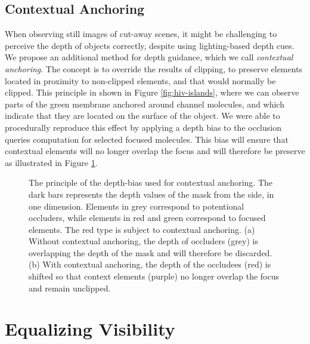 \subsection{Contextual Anchoring}
\label{ssec:anchoring}

When observing still images of cut-away scenes, it might be challenging to perceive the depth of objects correctly, despite using lighting-based depth cues.
We propose an additional method for depth guidance, which we call \emph{contextual anchoring}.
The concept is to override the results of clipping, to preserve elements located in proximity to non-clipped elements, and that would normally be clipped.
This principle in shown in Figure \ref{fig:hiv-islands}, where we can observe parts of the green membrane anchored around channel molecules, and which indicate that they are located on the surface of the object.
We were able to procedurally reproduce this effect by applying a depth bias to the occlusion queries computation for selected focused molecules.
This bias will ensure that contextual elements will no longer overlap the focus and will therefore be preserve as illustrated in Figure \ref{fig:islands}.



\begin{figure}[t]
\centering
{}
\caption{\label{fig:islands} 
The principle of the depth-bias used for contextual anchoring.
The dark bars represents the depth values of the mask from the side, in one dimension. 
Elements in grey correspond to potentional occluders, while elements in red and green correspond to focused elements.
The red type is subject to contextual anchoring.
(a) Without contextual anchoring, the depth of occluders (grey) is overlapping the depth of the mask and will therefore be discarded. 
(b) With contextual anchoring, the depth of the occludees (red) is shifted so that context elements (purple) no longer overlap the focus and remain unclipped.}
\vspace{-3mm}
\end{figure}

\section{Equalizing Visibility}



